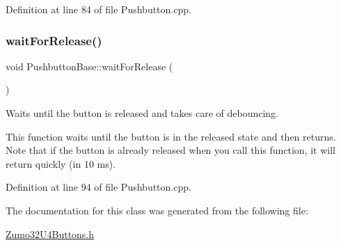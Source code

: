 Definition at line 84 of file Pushbutton.\+cpp.

\mbox{\label{class_pushbutton_base_ae5fff34b3e1ebd62fd02b99edd6bf13a}} 
\subsubsection{\texorpdfstring{wait\+For\+Release()}{waitForRelease()}}
{\footnotesize\ttfamily void Pushbutton\+Base\+::wait\+For\+Release (\begin{DoxyParamCaption}{ }\end{DoxyParamCaption})\hspace{0.3cm}{\ttfamily [inherited]}}



Waits until the button is released and takes care of debouncing. 

This function waits until the button is in the released state and then returns. Note that if the button is already released when you call this function, it will return quickly (in 10 ms). 

Definition at line 94 of file Pushbutton.\+cpp.



The documentation for this class was generated from the following file\+:\begin{DoxyCompactItemize}
\item 
\hyperlink{_zumo32_u4_buttons_8h}{Zumo32\+U4\+Buttons.\+h}\end{DoxyCompactItemize}
